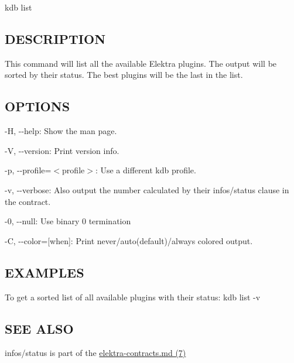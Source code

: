 {\ttfamily kdb list}

\subsection*{D\+E\+S\+C\+R\+I\+P\+T\+I\+O\+N}

This command will list all the available Elektra plugins. The output will be sorted by their status. The best plugins will be the last in the list.

\subsection*{O\+P\+T\+I\+O\+N\+S}


\begin{DoxyItemize}
\item {\ttfamily -\/\+H}, {\ttfamily -\/-\/help}\+: Show the man page.
\item {\ttfamily -\/\+V}, {\ttfamily -\/-\/version}\+: Print version info.
\item {\ttfamily -\/p}, {\ttfamily -\/-\/profile}=$<$profile$>$\+: Use a different kdb profile.
\item {\ttfamily -\/v}, {\ttfamily -\/-\/verbose}\+: Also output the number calculated by their {\ttfamily infos/status} clause in the contract.
\item {\ttfamily -\/0}, {\ttfamily -\/-\/null}\+: Use binary 0 termination
\item {\ttfamily -\/\+C}, {\ttfamily -\/-\/color}=\mbox{[}when\mbox{]}\+: Print never/auto(default)/always colored output.
\end{DoxyItemize}

\subsection*{E\+X\+A\+M\+P\+L\+E\+S}

To get a sorted list of all available plugins with their status\+: {\ttfamily kdb list -\/v}

\subsection*{S\+E\+E A\+L\+S\+O}


\begin{DoxyItemize}
\item {\ttfamily infos/status} is part of the \hyperlink{md_doc_help_elektra-contracts_doc_help_elektra-contracts_md}{elektra-\/contracts.md (7)} 
\end{DoxyItemize}